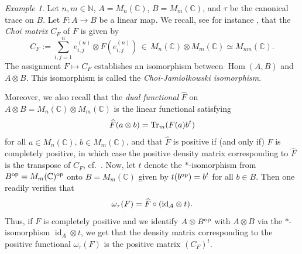 \documentclass[11pt, a4paper, oneside, final, reqno]{amsart}
\newcommand{\bbN}{\mathbb{N}}
\newcommand{\bbC}{\mathbb{C}}
\newcommand{\Hom}{\operatorname{Hom}}
\newcommand{\id}{\operatorname{id}}
\theoremstyle{definition}
\theoremstyle{plain}
\theoremstyle{remark}
\newtheorem{example}[definition]{Example}
\numberwithin{equation}{section}
\begin{document}
\begin{example}\label{example:Choi matrix}
    Let $n, m \in \bbN$, $A = M_n(\bbC)$, $B= M_m(\bbC)$, and $\tau$ be the canonical trace on $B$. Let $F \colon A \to B$ be a linear map. We recall, see for instance \cite[Chapter 4]{ES}, that the \emph{Choi matrix} $C_F$ of $F$ is given by
    \begin{equation*}
        C_F := \sum_{i,j = 1}^n e_{i,j}^{(n)} \otimes F(e_{i,j}^{(n)}) \, \in \, M_n(\bbC) \otimes M_m(\bbC) \simeq M_{nm}(\bbC).
    \end{equation*}
    The assignment $F \mapsto C_F$ establishes an isomorphism between $\Hom(A,B)$ and $A \otimes B$. This isomorphism is called the \emph{Choi-Jamio\l{}kowski isomorphism}.

    Moreover, we also recall that the \emph{dual functional} $\widehat F$ on $A \otimes B = M_n(\bbC) \otimes M_m(\bbC)$ is the linear functional satisfying
    \begin{equation*}
        \widehat F(a\otimes b) = {\rm Tr}_m (F(a) b^t)
    \end{equation*}
    for all $a \in M_n(\bbC)$, $b \in M_m(\bbC)$, and that $\widehat F$ is positive if (and only if) $F$ is completely positive, in which case the positive density matrix corresponding to $\widehat F$ is the transpose of $C_F$, cf.~\cite[Lemma 4.2.3 and Theorem 4.2.7]{ES}. Now, let $t$ denote the $*$-isomorphism from $B^{\rm op} = M_m(\bbC)^{\rm op}$ onto $B = M_m(\bbC)$ given by $t(b^{\rm op}) = b^t$ for all $b \in B$. Then one readily verifies that
    \begin{equation*}
        \omega_\tau(F) = \widehat F \circ ({\rm id}_A \otimes t).
    \end{equation*}
    Thus, if $F$ is completely positive and we identify $A \otimes B^{\rm op}$ with $A \otimes B$ via the $*$-isomorphism $\id_A \otimes t$, we get that the density matrix corresponding to the positive functional $\omega_\tau(F)$ is the positive matrix $(C_F)^t$.
\end{example}

\medskip
\end{document}
